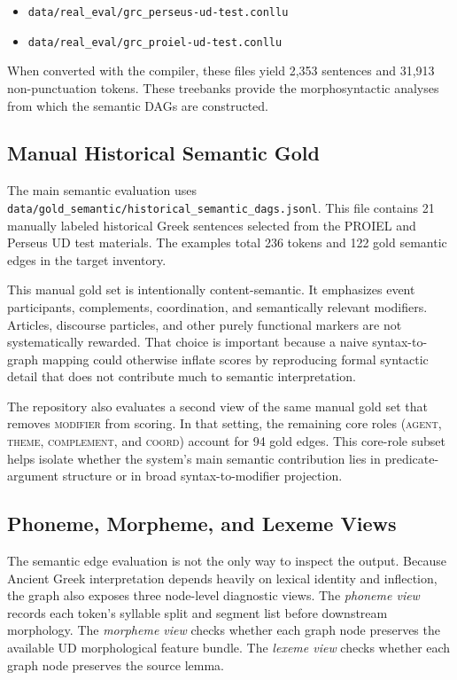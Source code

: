 \documentclass[11pt]{article}
\begin{document}
\begin{itemize}
  \item \texttt{data/real\_eval/grc\_perseus-ud-test.conllu}
  \item \texttt{data/real\_eval/grc\_proiel-ud-test.conllu}
\end{itemize}

When converted with the compiler, these files yield 2,353
sentences and 31,913 non-punctuation tokens. These treebanks provide the
morphosyntactic analyses from which the semantic DAGs are constructed.

\subsection{Manual Historical Semantic Gold}
The main semantic evaluation uses
\texttt{data/gold\_semantic/historical\_semantic\_dags.jsonl}. This file contains
21 manually labeled historical Greek sentences selected from the PROIEL and
Perseus UD test materials. The examples total 236 tokens and 122 gold semantic
edges in the target inventory.

This manual gold set is intentionally content-semantic. It emphasizes event
participants, complements, coordination, and semantically relevant modifiers.
Articles, discourse particles, and other purely functional markers are not
systematically rewarded. That choice is important because a naive syntax-to-graph
mapping could otherwise inflate scores by reproducing formal syntactic detail
that does not contribute much to semantic interpretation.

The repository also evaluates a second view of the same manual gold set that
removes \textsc{modifier} from scoring. In that setting, the remaining core roles
(\textsc{agent}, \textsc{theme}, \textsc{complement}, and \textsc{coord}) account
for 94 gold edges. This core-role subset helps isolate whether the system's main
semantic contribution lies in predicate-argument structure or in broad
syntax-to-modifier projection.

\subsection{Phoneme, Morpheme, and Lexeme Views}
The semantic edge evaluation is not the only way to inspect the output. Because
Ancient Greek interpretation depends heavily on lexical identity and inflection,
the graph also exposes three node-level diagnostic views. The \emph{phoneme
view} records each token's syllable split and segment list before downstream
morphology. The \emph{morpheme view} checks whether each graph node preserves
the available UD morphological feature bundle. The \emph{lexeme view} checks
whether each graph node preserves the source lemma.
\end{document}
